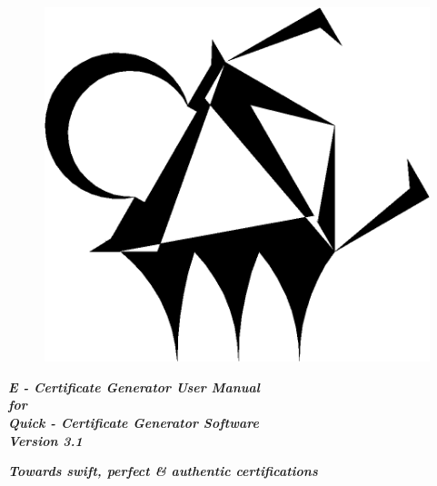 

\begin{titlingpage}
\thispagestyle{empty}\centering

\begin{figure}[H]
	\centering
	\includegraphics[width=0.7\linewidth]{"images/logo_no_bg copy"}
\end{figure}



\vspace{1.2cm}
\vspace{1.2cm}

\Large \textit{\textbf{E - Certificate Generator User Manual}}\\
\Large \textit{\textbf{for}}\\
\vspace{0.4cm}
\Large \textit{\textbf{Quick - Certificate Generator Software}}\\
\Large \textit{\textbf{Version 3.1}}

\vspace{2.5cm}
\normalsize\textit{\textbf{Towards swift, perfect \& authentic certifications}}




\end{titlingpage}
